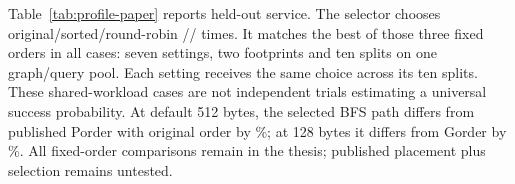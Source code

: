 Table~\ref{tab:profile-paper} reports held-out service. The selector chooses original/sorted/round-robin \ProfileOriginalChoices/\ProfileSortedChoices/\ProfileRRChoices{} times. It matches the best of those three fixed orders in all \ProfileOracleMatches{} cases: seven settings, two footprints and ten splits on one graph/query pool. Each setting receives the same choice across its ten splits. These shared-workload cases are not independent trials estimating a universal success probability. At default 512 bytes, the selected BFS path differs from published Porder with original order by \ProfileVsPorderFloat\%; at 128 bytes it differs from Gorder by \ProfileVsGorderCompact\%. All fixed-order comparisons remain in the thesis; published placement plus selection remains untested.
